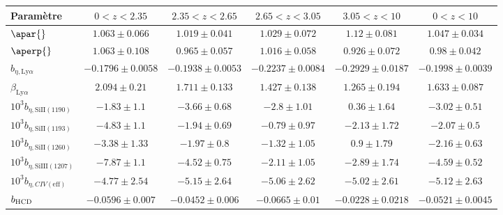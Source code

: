 \begin{table}[]
\begin{tabular}{lccccc}
\toprule
Param\`etre  & $\num{0} < z < \num{2.35}$ & $\num{2.35} < z < \num{2.65}$ & $\num{2.65} < z < \num{3.05}$ & $\num{3.05} < z < \num{10}$  & $\num{0} < z < \num{10}$ \\
\midrule
$\apar{} $ & $ 1.063 \pm 0.066$ & $ 1.019 \pm 0.041$ & $ 1.029 \pm 0.072$ & $ 1.12 \pm 0.081$ & $ 1.047 \pm 0.034$ \\
$\aperp{} $ & $ 1.063 \pm 0.108$ & $ 0.965 \pm 0.057$ & $ 1.016 \pm 0.058$ & $ 0.926 \pm 0.072$ & $ 0.98 \pm 0.042$ \\
$b_{\eta, \mathrm{Ly}\alpha} $ & $ -0.1796 \pm 0.0058$ & $ -0.1938 \pm 0.0053$ & $ -0.2237 \pm 0.0084$ & $ -0.2929 \pm 0.0187$ & $ -0.1998 \pm 0.0039$ \\
$\beta_{\mathrm{Ly}\alpha} $ & $ 2.094 \pm 0.21$ & $ 1.711 \pm 0.133$ & $ 1.427 \pm 0.138$ & $ 1.265 \pm 0.194$ & $ 1.633 \pm 0.087$ \\
$10^3 b_{\eta, \mathrm{SiII}(1190)} $ & $ -1.83 \pm 1.1$ & $ -3.66 \pm 0.68$ & $ -2.8 \pm 1.01$ & $ 0.36 \pm 1.64$ & $ -3.02 \pm 0.51$ \\
$10^3 b_{\eta, \mathrm{SiII}(1193)} $ & $ -4.83 \pm 1.1$ & $ -1.94 \pm 0.69$ & $ -0.79 \pm 0.97$ & $ -2.13 \pm 1.72$ & $ -2.07 \pm 0.5$ \\
$10^3 b_{\eta, \mathrm{SiII}(1260)} $ & $ -3.38 \pm 1.33$ & $ -1.97 \pm 0.8$ & $ -1.32 \pm 1.05$ & $ 0.9 \pm 1.79$ & $ -2.16 \pm 0.63$ \\
$10^3 b_{\eta, \mathrm{SiIII}(1207)} $ & $ -7.87 \pm 1.1$ & $ -4.52 \pm 0.75$ & $ -2.11 \pm 1.05$ & $ -2.89 \pm 1.74$ & $ -4.59 \pm 0.52$ \\
$10^3 b_{\eta, CIV(\mathrm{eff})} $ & $ -4.77 \pm 2.54$ & $ -5.15 \pm 2.64$ & $ -5.06 \pm 2.62$ & $ -5.02 \pm 2.61$ & $ -5.12 \pm 2.63$ \\
$b_{\textsc{HCD}} $ & $ -0.0596 \pm 0.007$ & $ -0.0452 \pm 0.006$ & $ -0.0665 \pm 0.01$ & $ -0.0228 \pm 0.0218$ & $ -0.0521 \pm 0.0045$ \\

\end{tabular}
\end{table}
